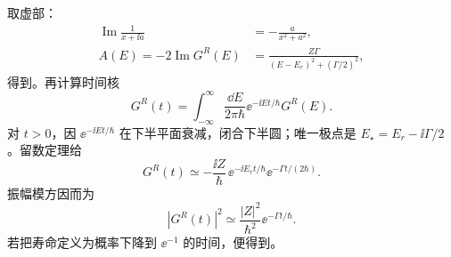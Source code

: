 \begin{exbox}
取虚部：
\begin{align*}
 \operatorname{Im}\frac{1}{x+\ii a}
 &=-\frac{a}{x^2+a^2},\\
 A(E)=-2\operatorname{Im}G^R(E)
 &=\frac{Z\Gamma}{(E-E_r)^2+(\Gamma/2)^2},
\end{align*}
得到。再计算时间核
\begin{equation*}
 G^R(t)=\int_{-\infty}^{\infty}\frac{\dd E}{2\pi\hbar}
 \ee^{-\ii Et/\hbar}G^R(E).
\end{equation*}
对 $t>0$，因 $\ee^{-\ii Et/\hbar}$ 在下半平面衰减，闭合下半圆；唯一极点是 $E_\star=E_r-\ii\Gamma/2$。留数定理给
\begin{equation*}
 G^R(t)\simeq
 -\frac{\ii Z}{\hbar}\,
 \ee^{-\ii E_rt/\hbar}\ee^{-\Gamma t/(2\hbar)}.
\end{equation*}
振幅模方因而为
\begin{equation*}
 |G^R(t)|^2\simeq
 \frac{|Z|^2}{\hbar^2}\ee^{-\Gamma t/\hbar}.
\end{equation*}
若把寿命定义为概率下降到 $\ee^{-1}$ 的时间，便得到。
\end{exbox}


